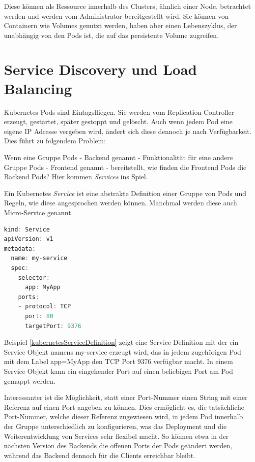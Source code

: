 Diese können als Ressource innerhalb des Clusters, ähnlich einer Node, betrachtet werden und werden vom Administrator bereitgestellt wird.
Sie können von Containern wie Volumes genutzt werden, haben aber einen Lebenszyklus, der unabhängig von den Pods ist, die auf das persistente Volume zugreifen.
\newpage

\section{Service Discovery und Load Balancing}

Kubernetes Pods sind Eintagsfliegen.
Sie werden vom Replication Controller erzeugt, gestartet, später gestoppt und gelöscht.
Auch wenn jedem Pod eine eigene IP Adresse vergeben wird, ändert sich diese dennoch je nach Verfügbarkeit. 
Dies führt zu folgendem Problem:

Wenn eine Gruppe Pods - Backend genannt - Funktionalität für eine andere Gruppe Pods - Frontend genannt - bereitstellt, wie finden die Frontend Pods die Backend Pods?
Hier kommen \textit{Services} ins Spiel.

Ein Kubernetes \textit{Service} ist eine abstrakte Definition einer Gruppe von Pods und Regeln, wie diese angesprochen werden können. 
Manchmal werden diese auch Micro-Service genannt.

\begin{minipage}{\linewidth}
\begin{lstlisting}[frame=single,caption=Kubernetes Service Definition, label=kubernetesServiceDefinition, language=Scala]
kind: Service
apiVersion: v1
metadata:
  name: my-service
  spec:
    selector:
      app: MyApp
    ports:
    - protocol: TCP
      port: 80
      targetPort: 9376
\end{lstlisting}
\end{minipage}

Beispiel \ref{kubernetesServiceDefinition} zeigt eine Service Definition mit der ein Service Objekt namens \glqq{}my-service\grqq{} erzeugt wird, das in jedem zugehörigen Pod mit dem Label \glqq{}app=MyApp\grqq{} den TCP Port 9376 verfügbar macht.
In einem Service Objekt kann ein eingehender Port auf einen beliebigen Port am Pod gemappt werden.

Interessanter ist die Möglichkeit, statt einer Port-Nummer einen String mit einer Referenz auf einen Port angeben zu können.
Dies ermöglicht es, die tatsächliche Port-Nummer, welche dieser Referenz zugewiesen wird, in jedem Pod innerhalb der Gruppe unterschiedlich zu konfigurieren, was das Deployment und die Weiterentwicklung von Services sehr flexibel macht.
So können etwa in der nächsten Version des Backends die offenen Ports der Pods geändert werden, während das Backend dennoch für die Clients erreichbar bleibt.

